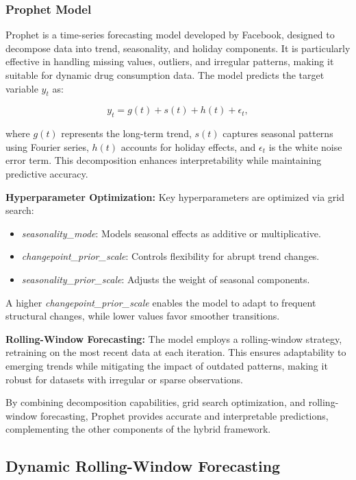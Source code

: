 \documentclass[journal]{IEEEtran}
\begin{document}
\subsubsection{Prophet Model}

Prophet is a time-series forecasting model developed by Facebook, designed to decompose data into trend, seasonality, and holiday components. It is particularly effective in handling missing values, outliers, and irregular patterns, making it suitable for dynamic drug consumption data. The model predicts the target variable \(y_t\) as:

\begin{equation}
y_{t} = g(t) + s(t) + h(t) + \epsilon_{t},
\end{equation}

where \(g(t)\) represents the long-term trend, \(s(t)\) captures seasonal patterns using Fourier series, \(h(t)\) accounts for holiday effects, and \(\epsilon_{t}\) is the white noise error term. This decomposition enhances interpretability while maintaining predictive accuracy.

\textbf{Hyperparameter Optimization:} Key hyperparameters are optimized via grid search:
\begin{itemize}
    \item \textit{seasonality\_mode}: Models seasonal effects as additive or multiplicative.
    \item \textit{changepoint\_prior\_scale}: Controls flexibility for abrupt trend changes.
    \item \textit{seasonality\_prior\_scale}: Adjusts the weight of seasonal components.
\end{itemize}
A higher \textit{changepoint\_prior\_scale} enables the model to adapt to frequent structural changes, while lower values favor smoother transitions.

\textbf{Rolling-Window Forecasting:} The model employs a rolling-window strategy, retraining on the most recent data at each iteration. This ensures adaptability to emerging trends while mitigating the impact of outdated patterns, making it robust for datasets with irregular or sparse observations.

By combining decomposition capabilities, grid search optimization, and rolling-window forecasting, Prophet provides accurate and interpretable predictions, complementing the other components of the hybrid framework.

\subsection{Dynamic Rolling-Window Forecasting}
\end{document}
